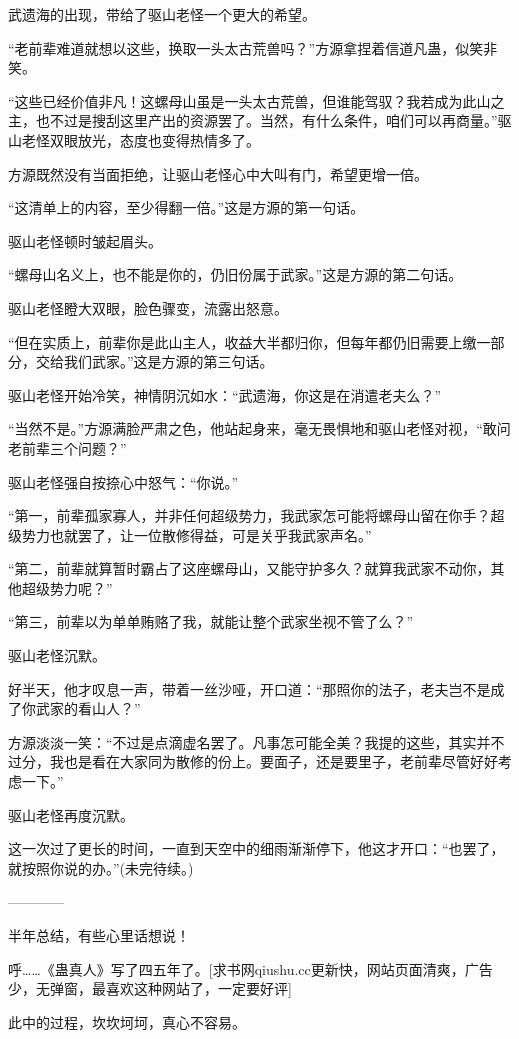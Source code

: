 \begin{this_body}
武遗海的出现，带给了驱山老怪一个更大的希望。

“老前辈难道就想以这些，换取一头太古荒兽吗？”方源拿捏着信道凡蛊，似笑非笑。

“这些已经价值非凡！这螺母山虽是一头太古荒兽，但谁能驾驭？我若成为此山之主，也不过是搜刮这里产出的资源罢了。当然，有什么条件，咱们可以再商量。”驱山老怪双眼放光，态度也变得热情多了。

方源既然没有当面拒绝，让驱山老怪心中大叫有门，希望更增一倍。

“这清单上的内容，至少得翻一倍。”这是方源的第一句话。

驱山老怪顿时皱起眉头。

“螺母山名义上，也不能是你的，仍旧份属于武家。”这是方源的第二句话。

驱山老怪瞪大双眼，脸色骤变，流露出怒意。

“但在实质上，前辈你是此山主人，收益大半都归你，但每年都仍旧需要上缴一部分，交给我们武家。”这是方源的第三句话。

驱山老怪开始冷笑，神情阴沉如水：“武遗海，你这是在消遣老夫么？”

“当然不是。”方源满脸严肃之色，他站起身来，毫无畏惧地和驱山老怪对视，“敢问老前辈三个问题？”

驱山老怪强自按捺心中怒气：“你说。”

“第一，前辈孤家寡人，并非任何超级势力，我武家怎可能将螺母山留在你手？超级势力也就罢了，让一位散修得益，可是关乎我武家声名。”

“第二，前辈就算暂时霸占了这座螺母山，又能守护多久？就算我武家不动你，其他超级势力呢？”

“第三，前辈以为单单贿赂了我，就能让整个武家坐视不管了么？”

驱山老怪沉默。

好半天，他才叹息一声，带着一丝沙哑，开口道：“那照你的法子，老夫岂不是成了你武家的看山人？”

方源淡淡一笑：“不过是点滴虚名罢了。凡事怎可能全美？我提的这些，其实并不过分，我也是看在大家同为散修的份上。要面子，还是要里子，老前辈尽管好好考虑一下。”

驱山老怪再度沉默。

这一次过了更长的时间，一直到天空中的细雨渐渐停下，他这才开口：“也罢了，就按照你说的办。”(未完待续。)

------------

半年总结，有些心里话想说！

呼……《蛊真人》写了四五年了。[求书网qiushu.cc更新快，网站页面清爽，广告少，无弹窗，最喜欢这种网站了，一定要好评]

此中的过程，坎坎坷坷，真心不容易。


\end{this_body}
